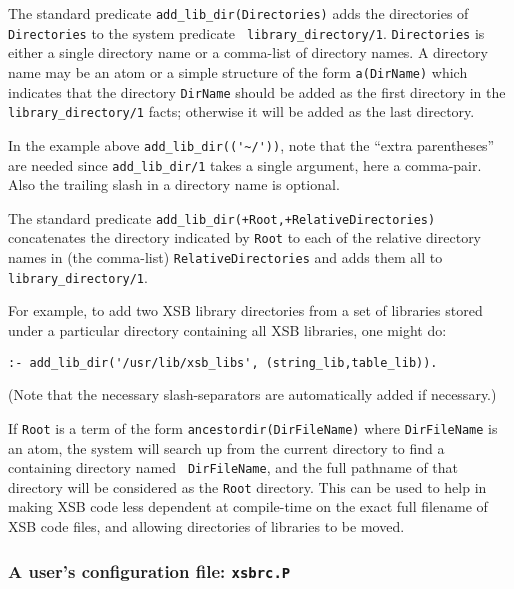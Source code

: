 \begin{description}
%
The standard predicate {\tt add\_lib\_dir(Directories)} adds the
directories of {\tt Directories} to the system predicate {\tt
  library\_directory/1}.  {\tt Directories} is either a single
directory name or a comma-list of directory names.  A directory name
may be an atom or a simple structure of the form {\tt a(DirName)}
which indicates that the directory {\tt DirName} should be added as
the first directory in the {\tt library\_directory/1} facts; otherwise
it will be added as the last directory.  

In the example above \verb|add_lib_dir(('~/'))|, note that the ``extra
parentheses'' are needed since {\tt add\_lib\_dir/1} takes a single
argument, here a comma-pair.  Also the trailing slash in a directory
name is optional.

The standard predicate {\tt add\_lib\_dir(+Root,+RelativeDirectories)}
concatenates the directory indicated by {\tt Root} to each of the
relative directory names in (the comma-list) {\tt RelativeDirectories}
and adds them all to {\tt library\_directory/1}.

For example, to add two XSB library directories from a set of
libraries stored under a particular directory containing all XSB
libraries, one might do:
\begin{verbatim}
:- add_lib_dir('/usr/lib/xsb_libs', (string_lib,table_lib)).
\end{verbatim}

(Note that the necessary slash-separators are automatically added if
necessary.) 

If {\tt Root} is a term of the form {\tt ancestordir(DirFileName)}
where {\tt DirFileName} is an atom, the system will search up from the
current directory to find a containing directory named {\tt
  DirFileName}, and the full pathname of that directory will be
considered as the {\tt Root} directory.  This can be used to help in
making XSB code less dependent at compile-time on the exact full
filename of XSB code files, and allowing directories of libraries to
be moved.
\end{description}

\subsubsection{A user's configuration file: {\tt xsbrc.P}}

